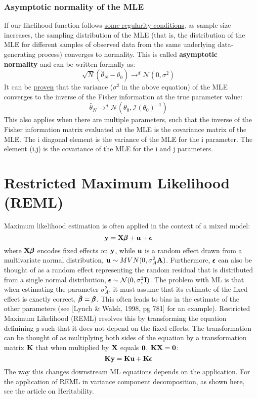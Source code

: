 \documentclass[12pt]{article}
\begin{document}
\subsubsection{Asymptotic normality of the MLE}
If our likelihood function follows \href{https://en.wikipedia.org/wiki/Fisher_information#Regularity_conditions}{some regularity conditions}, as sample size increases, the sampling distribution of the MLE (that is, the distribution of the MLE for different samples of observed data from the same underlying data-generating process) converges to normality. This is called \textbf{asymptotic normality} and can be written formally as:
$$
\sqrt{N}
(\hat{\theta}_N - \theta_0)
\rightarrow^d
\mathcal{N}(0, \sigma^2)
$$
It can be \href{https://gregorygundersen.com/blog/2019/11/28/asymptotic-normality-mle/}{proven} that the variance ($\sigma^2$ in the above equation) of the MLE converges to the inverse of the Fisher information at the true parameter value:
$$
\hat{\theta}_N
\rightarrow^d
\mathcal{N}(\theta_0, \mathcal{I}(\theta_0)^{-1})
$$
This also applies when there are multiple parameters, such that the inverse of the Fisher information matrix evaluated at the MLE is the covariance matrix of the MLE.
The i diagonal element is the variance of the MLE for the i parameter.
The element (i,j) is the covariance of the MLE for the i and j parameters.

\section{Restricted Maximum Likelihood (REML)}
Maximum likelihood estimation is often applied in the context of a mixed model:
$$
\mathbf{y} = \mathbf{X} \pmb{\beta} + \mathbf{u} + \pmb{\epsilon}
$$
where $\mathbf{X} \pmb{\beta}$ encodes fixed effects on $\mathbf{y}$, while $\mathbf{u}$ is a random effect drawn from a multivariate normal distribution, $\mathbf{u} \sim MVN(0, \sigma_A^2 \mathbf{A})$. Furthermore, $\pmb{\epsilon}$ can also be thought of as a random effect representing the random residual that is distributed from a single normal distribution, $\pmb{\epsilon} \sim \mathcal{N}(0, \sigma_{\epsilon}^2 \mathbf{I})$. The problem with ML is that when estimating the parameter $\sigma_A^2$, it must assume that its estimate of the fixed effect is exactly correct, $\hat{\pmb{\beta}} = \pmb{\beta}$. This often leads to bias in the estimate of the other parameters (see [Lynch \& Walsh, 1998, pg 781] for an example). Restricted Maximum Likelihood (REML) resolves this by transforming the equation definining $y$ such that it does not depend on the fixed effects. The transformation can be thought of as multiplying both sides of the equation by a transformation matrix $\mathbf{K}$ that when multiplied by $\mathbf{X}$ equals $\textbf{0}$, $\mathbf{K} \mathbf{X} = \textbf{0}$:
$$
\mathbf{K} \mathbf{y} = \mathbf{K} \mathbf{u} + \mathbf{K} \pmb{\epsilon}
$$
The way this changes downstream ML equations depends on the application. For the application of REML in variance component decomposition, as shown here, see the article on Heritability.
\end{document}

